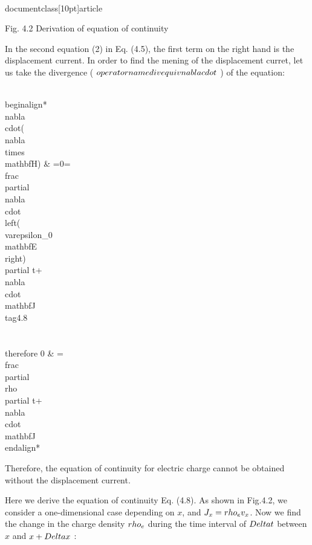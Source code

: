 \\documentclass[10pt]{article}
\begin{document}
Fig. 4.2 Derivation of equation of continuity

In the second equation (2) in Eq. (4.5), the first term on the right hand is the displacement current. In order to find the mening of the displacement curret, let us take the divergence ( $\\operatorname{div} \\equiv \\nabla \\cdot$ ) of the equation:


\\begin{align*}
\\nabla \\cdot(\\nabla \\times \\mathbf{H}) & =0=\\frac{\\partial \\nabla \\cdot\\left(\\varepsilon_{0} \\mathbf{E}\\right)}{\\partial t}+\\nabla \\cdot \\mathbf{J}  \\tag{4.8}\\\\
\\therefore 0 & =\\frac{\\partial \\rho}{\\partial t}+\\nabla \\cdot \\mathbf{J}
\\end{align*}


Therefore, the equation of continuity for electric charge cannot be obtained without the displacement current.

Here we derive the equation of continuity Eq. (4.8). As shown in Fig.4.2, we consider a one-dimensional case depending on $x$, and $J_{x}=\\rho_{e} v_{x}$. Now we find the change in the charge density $\\rho_{e}$ during the time interval of $\\Delta t$ between $x$ and $x+\\Delta x$ :
\end{document}
